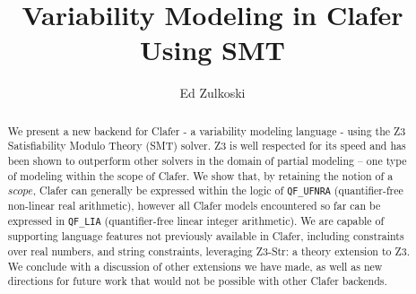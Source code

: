 \documentclass{easychair}
\begin{document}
%
\title{Variability Modeling in Clafer Using SMT}



%
\author{
Ed Zulkoski\\
}




\clearpage

\maketitle

\begin{abstract}
We present a new backend for Clafer - a variability modeling language - using the Z3 Satisfiability Modulo Theory (SMT) solver. Z3 is well respected for its speed and has been shown to outperform other solvers in the domain of partial modeling -- one type of modeling within the scope of Clafer. We show that, by retaining the notion of a $scope$, Clafer can generally be expressed within the logic of \texttt{QF\_UFNRA} (quantifier-free non-linear real arithmetic), however all Clafer models encountered so far can be expressed in \texttt{QF\_LIA} (quantifier-free linear integer arithmetic). We are capable of supporting language features not previously available in Clafer, including constraints over real numbers, and string constraints, leveraging Z3-Str: a theory extension to Z3. We conclude with a discussion of other extensions we have made, as well as new directions for future work that would not be possible with other Clafer backends.
\end{abstract}
\end{document}
